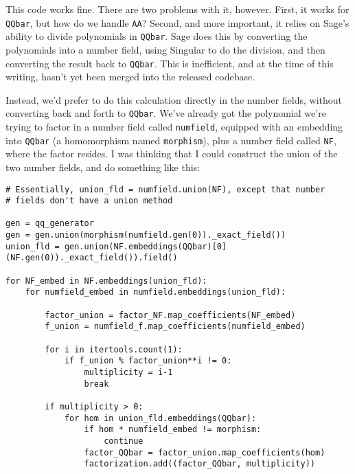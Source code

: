 \documentclass{article}
\begin{document}
This code works fine.  There are two problems with it, however.
First, it works for {\tt QQbar}, but how do we handle {\tt AA}?
Second, and more important, it relies on Sage's ability to divide
polynomials in {\tt QQbar}.  Sage does this by converting the polynomials
into a number field, using Singular to do the division, and then
converting the result back to {\tt QQbar}.  This is inefficient, and
at the time of this writing, hasn't yet been merged into the released
codebase.

Instead, we'd prefer to do this calculation directly in the number
fields, without converting back and forth to {\tt QQbar}.  We've
already got the polynomial we're trying to factor in a number field
called {\tt numfield}, equipped with an embedding into {\tt QQbar}
(a homomorphism named {\tt morphism}), plus a number field
called {\tt NF}, where the factor resides.
I was thinking that I could construct the union of the two number
fields, and do something like this:








\begin{verbatim}
# Essentially, union_fld = numfield.union(NF), except that number
# fields don't have a union method

gen = qq_generator
gen = gen.union(morphism(numfield.gen(0))._exact_field())
union_fld = gen.union(NF.embeddings(QQbar)[0](NF.gen(0))._exact_field()).field()

for NF_embed in NF.embeddings(union_fld):
    for numfield_embed in numfield.embeddings(union_fld):

        factor_union = factor_NF.map_coefficients(NF_embed)
        f_union = numfield_f.map_coefficients(numfield_embed)

        for i in itertools.count(1):
            if f_union % factor_union**i != 0:
                multiplicity = i-1
                break

        if multiplicity > 0:
            for hom in union_fld.embeddings(QQbar):
                if hom * numfield_embed != morphism:
                    continue
                factor_QQbar = factor_union.map_coefficients(hom)
                factorization.add((factor_QQbar, multiplicity))
\end{verbatim}
\end{document}
